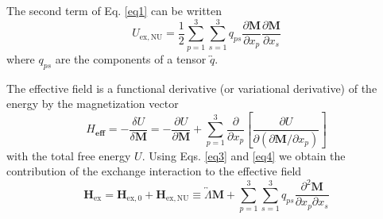 \documentclass[12pt,a4paper]{article}
\begin{document}
The second term of Eq. \eqref{eq1} can be written
\begin{equation}
    U_{\mathrm{ex,NU}} = \frac{1}{2} \sum_{p=1}^3 \sum_{s=1}^3 q_{ps} \frac{\partial \mathbf{M}}{\partial x_p} \frac{\partial \mathbf{M}}{\partial x_s}
    \label{eq3}
\end{equation}
where $q_{ps}$ are the components of a tensor $\overleftrightarrow{q}$.

The effective field is a functional derivative (or variational derivative) of the energy by the magnetization vector
\begin{equation}
    H_{\mathbf{eff}} = - \frac{\delta U}{\delta \mathbf{M}} = - \frac{\partial U}{\partial \mathbf{M}} + \sum_{p=1}^3 \frac{\partial}{\partial x_p} \left[ \frac{\partial U}{\partial \left(\partial \mathbf{M} / \partial x_{p} \right)} \right]
    \label{eq4}
\end{equation}
with the total free energy $U$.
Using Eqs. \eqref{eq3} and \eqref{eq4} we obtain the contribution of the exchange interaction to the effective field
\begin{equation}
    \mathbf{H}_{\mathrm{ex}} = \mathbf{H}_{\mathrm{ex,0}} + \mathbf{H}_{\mathrm{ex,NU}} \equiv \overleftrightarrow{\Lambda} \mathbf{M} + \sum_{p=1}^3 \sum_{s=1}^3 q_{ps} \frac{\partial^2 \mathbf{M}}{\partial x_p \partial x_s}
    \label{eq5}
\end{equation}
\end{document}
